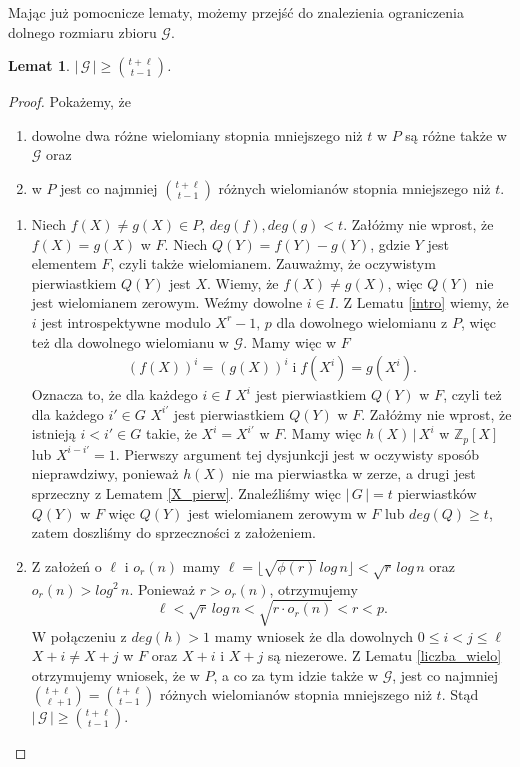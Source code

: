 \documentclass[declaration,shortabstract]{iithesis}
\theoremstyle{definition}
\theoremstyle{remark} \newtheorem{observation}{Obserwacja}
\theoremstyle{plain} \newtheorem{theorem}{Twierdzenie}
\theoremstyle{plain} \newtheorem{lemma}{Lemat}
\theoremstyle{remark} \newtheorem*{remark*}{Uwaga}
\theoremstyle{reminder} \newtheorem*{reminder*}{Przypomnienie}
\begin{document}
Mając już pomocnicze lematy, możemy przejść do znalezienia ograniczenia dolnego rozmiaru zbioru $\mathcal{G}$.
	
\begin{lemma} \label{lower}
	$| \, \mathcal{G} \,| \geq {t + \ell \choose t - 1}$.
\end{lemma}
	
\begin{proof}
	Pokażemy, że 
	\begin{enumerate}[label=\arabic*.,leftmargin=.4in] 
		\item dowolne dwa różne wielomiany stopnia mniejszego niż $t$ w $P$ są różne także w $\mathcal{G}$ oraz
		\item w $P$ jest co najmniej  ${t + \ell \choose t - 1}$ różnych wielomianów stopnia mniejszego niż $t$. 
	\end{enumerate}
	\begin{enumerate}[label=Ad.\arabic*.,leftmargin=.4in]
		\item Niech $f(X) \neq g(X) \in P, \, deg(f), deg(g) < t$. Załóżmy nie wprost, że $f(X) = g(X)$ w $F$. 
		      Niech $Q(Y) = f(Y) - g(Y)$, gdzie $Y$ jest elementem $F$, czyli także wielomianem. Zauważmy, że oczywistym pierwiastkiem $Q(Y)$ jest $X$. Wiemy, że $f(X) \neq g(X)$, więc $Q(Y)$ nie jest wielomianem zerowym. Weźmy dowolne $i \in I$. Z Lematu \ref{intro} wiemy, że $i$ jest introspektywne modulo $X^r - 1, \, p$ dla dowolnego wielomianu z $P$, więc też dla dowolnego wielomianu w $\mathcal{G}$. Mamy więc w $F$
		      \begin{align*}
		      	(f(X))^i = (g(X))^i \; \text{i} \; f(X^i) = g(X^i). 
		      \end{align*}
		      Oznacza to, że dla każdego $i \in I$ $X^i$ jest pierwiastkiem $Q(Y)$ w $F$, czyli też dla każdego $i' \in G$ $X^{i'}$ jest pierwiastkiem $Q(Y)$ w $F$. Załóżmy nie wprost, że istnieją $i < i' \in G$ takie, że $X^i = X^{i'}$ w $F$. Mamy więc $h(X) \, | \, X^i$ w $\mathbb{Z}_p[X]$ lub $X^{i - i'} = 1$. Pierwszy argument tej dysjunkcji jest w oczywisty sposób nieprawdziwy, ponieważ $h(X)$ nie ma pierwiastka w zerze, a drugi jest sprzeczny z Lematem \ref{X_pierw}.
		      Znaleźliśmy więc $|\,G\,| = t$ pierwiastków $Q(Y)$ w $F$ więc $Q(Y)$ jest wielomianem zerowym w $F$ lub $deg(Q) \geq t$, zatem doszliśmy do sprzeczności z założeniem.
		\item Z założeń o $\ell$ i $o_r(n)$ mamy $\ell = \lfloor \sqrt{\phi(r)} \, log\, n \rfloor < \sqrt{r} \, log \, n $ oraz $o_r(n) > log^2 \, n$. Ponieważ $r > o_r(n)$, otrzymujemy \[\ell < \sqrt{r} \, log \, n < \sqrt{r \cdot o_r(n)} < r < p.\] W połączeniu z $deg(h) > 1$ mamy wniosek że dla dowolnych $0 \leq i < j \leq \ell$ $X + i \neq X + j$ w $F$ oraz $X + i$ i $X + j$ są niezerowe. 
		      \newline Z Lematu \ref{liczba_wielo} otrzymujemy wniosek, że w $P$, a co za tym idzie także w $\mathcal{G}$, jest co najmniej ${t + \ell \choose \ell + 1} = {t + \ell \choose t - 1}$ różnych wielomianów stopnia mniejszego niż $t$. Stąd $| \, \mathcal{G} \, | \geq {t + \ell \choose t - 1}$.
	\end{enumerate}
\end{proof}
    
\end{document}
